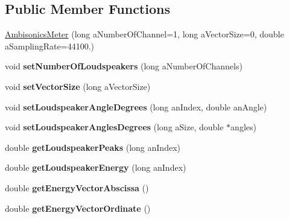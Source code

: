 \subsection*{Public Member Functions}
\begin{DoxyCompactItemize}
\item 
\hyperlink{class_ambisonics_meter_ab6652775a732fc5d190101e5673c6758}{Ambisonics\-Meter} (long a\-Number\-Of\-Channel=1, long a\-Vector\-Size=0, double a\-Sampling\-Rate=44100.)
\item 
\hypertarget{class_ambisonics_meter_a67dcdc08682898d4460cf8e04f53a201}{void {\bfseries set\-Number\-Of\-Loudspeakers} (long a\-Number\-Of\-Channels)}\label{class_ambisonics_meter_a67dcdc08682898d4460cf8e04f53a201}

\item 
\hypertarget{class_ambisonics_meter_a14720821cf28453bc1609a234121c040}{void {\bfseries set\-Vector\-Size} (long a\-Vector\-Size)}\label{class_ambisonics_meter_a14720821cf28453bc1609a234121c040}

\item 
\hypertarget{class_ambisonics_meter_a991f4c9b08bf47e0eb10fda9e907f511}{void {\bfseries set\-Loudspeaker\-Angle\-Degrees} (long an\-Index, double an\-Angle)}\label{class_ambisonics_meter_a991f4c9b08bf47e0eb10fda9e907f511}

\item 
\hypertarget{class_ambisonics_meter_a58425860d8afb4eb62328833e68baf12}{void {\bfseries set\-Loudspeaker\-Angles\-Degrees} (long a\-Size, double $\ast$angles)}\label{class_ambisonics_meter_a58425860d8afb4eb62328833e68baf12}

\item 
\hypertarget{class_ambisonics_meter_a15bbfeebc227c01a4041316905e051c7}{double {\bfseries get\-Loudspeaker\-Peaks} (long an\-Index)}\label{class_ambisonics_meter_a15bbfeebc227c01a4041316905e051c7}

\item 
\hypertarget{class_ambisonics_meter_a2a1f8138c0b030eeb3f83a536c72e6e4}{double {\bfseries get\-Loudspeaker\-Energy} (long an\-Index)}\label{class_ambisonics_meter_a2a1f8138c0b030eeb3f83a536c72e6e4}

\item 
\hypertarget{class_ambisonics_meter_a73f0f5db0e7e5e15080d907cddc48e98}{double {\bfseries get\-Energy\-Vector\-Abscissa} ()}\label{class_ambisonics_meter_a73f0f5db0e7e5e15080d907cddc48e98}

\item 
\hypertarget{class_ambisonics_meter_a737f7cf7c2392a3caa50fc79daad1500}{double {\bfseries get\-Energy\-Vector\-Ordinate} ()}\label{class_ambisonics_meter_a737f7cf7c2392a3caa50fc79daad1500}


\end{DoxyCompactItemize}
